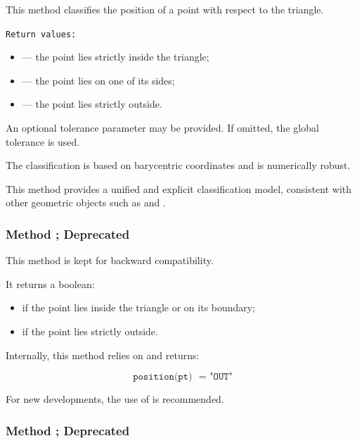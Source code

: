 This method classifies the position of a point 
with respect to the triangle.

\medskip

\texttt{Return values: }
\begin{itemize}
  \item {}  — the point lies strictly inside the triangle;
  \item {}  — the point lies on one of its sides;
  \item {} — the point lies strictly outside.
\end{itemize}

\medskip

An optional tolerance parameter  may be provided.
If omitted, the global tolerance  is used.

\medskip

The classification is based on barycentric coordinates
and is numerically robust.

\medskip

This method provides a unified and explicit classification model,
consistent with other geometric objects such as
 and .



\subsubsection{Method ; Deprecated}
\label{ssub:_triangle_in__out_pt}


This method is kept for backward compatibility.

It returns a boolean:

\begin{itemize}
  \item {}  if the point lies inside the triangle
        or on its boundary;
  \item {} if the point lies strictly outside.
\end{itemize}

\medskip

Internally, this method relies on
 and returns:

\[
\texttt{position(pt) ~= "OUT"}
\]

\medskip

For new developments, the use of
 is recommended.


\subsubsection{Method ; Deprecated}
\label{ssub:method_triangle_on_triangle}

